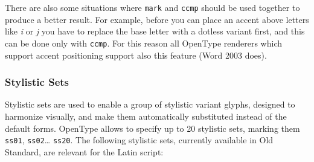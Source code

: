\documentclass[12pt,a4paper,openany]{book}
\begin{document}
There are also some situations where \texttt{mark} and \texttt{ccmp} should
be used together to produce a better result. For example, before you can
place an accent above letters like \textit{i} or \textit{j} you have to
replace the base letter with a dotless variant first, and this can be done
only with \texttt{ccmp}. For this reason all OpenType renderers which
support accent positioning support also this feature (Word 2003 does).

\subsubsection{Stylistic Sets}

Stylistic sets are used to enable a group of stylistic variant glyphs,
designed to harmonize visually, and make them automatically substituted
instead of the default forms. OpenType allows to specify up to 20 stylistic
sets, marking them \texttt{ss01}, \texttt{ss02}\ldots{} \texttt{ss20}. The
following stylistic sets, currently available in Old Standard, are relevant
for the Latin script:
\end{document}
